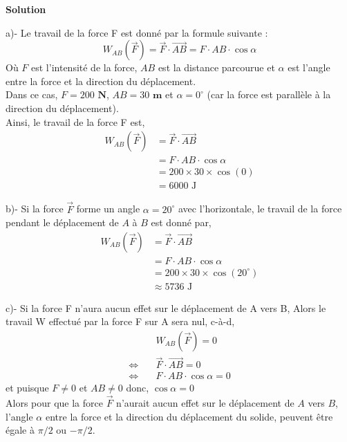 \documentclass[10pt]{beamer}
\begin{document}
\begin{frame}
\textbf{Solution}
\begin{alertblock}{}
a)- Le travail de la force F est donné par la formule suivante :
\begin{equation*}
W_{AB}(\overrightarrow{F}) = \overrightarrow{F} \cdot \overrightarrow{AB} = F \cdot AB \cdot \cos\alpha
\end{equation*}
Où $F$ est l'intensité de la force, $AB$ est la distance parcourue et $\alpha$ est l'angle entre la force et la direction du déplacement.\\
Dans ce cas, $F = 200 \textbf{ N}$, $AB = 30 \textbf{ m}$ et $\alpha = 0^\circ$ (car la force est parallèle à la direction du déplacement).\\
Ainsi, le travail de la force F est,
\begin{align*}
    W_{AB}(\overrightarrow{F}) &= \overrightarrow{F} \cdot \overrightarrow{AB} \\
    & = F \cdot AB \cdot \cos\alpha \\ 
    &= 200 \times 30 \times \cos(0) \\
    &= \boxed{6000 \text{ J}}
\end{align*}
\end{alertblock}
\end{frame}
\begin{frame}
\begin{alertblock}{}
b)- Si la force $\overrightarrow{F}$ forme un angle $\alpha = 20^\circ$ avec l'horizontale, le travail de la force pendant le déplacement de $A$ à $B$ est donné par,
\begin{align*}
W_{AB}(\overrightarrow{F}) &= \overrightarrow{F} \cdot \overrightarrow{AB} \\
&= F \cdot AB \cdot \cos\alpha \\
&= 200 \times 30 \times \cos(20^\circ) \\
&\approx \boxed{5736 \text{ J}}
\end{align*}
\end{alertblock}
\end{frame}

\begin{frame}
\begin{alertblock}{}
c)- Si la force F n'aura aucun effet sur le déplacement de A vers B, Alors le travail W effectué par la force F sur A sera nul, c-à-d,
\begin{align*}
 \quad & W_{AB}(\overrightarrow{F}) = 0  \\
\Longleftrightarrow \quad &\overrightarrow{F} \cdot \overrightarrow{AB}=0 \\
\Longleftrightarrow \quad & F \cdot AB \cdot \cos\alpha = 0
\end{align*}
\noindent et puisque $F \neq 0$ et $AB \neq 0$ donc,
$\cos\alpha = 0$\\
Alors pour que la force $\overrightarrow{F}$ n’aurait aucun effet sur le déplacement de $A$ vers $B$, l'angle $\alpha$ entre la force et la direction du déplacement du solide, peuvent être égale à $\pi/2$ ou $-\pi/2$.
\end{alertblock}
\end{frame}
\end{document}
